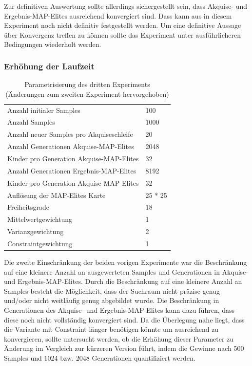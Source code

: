
Zur definitiven Auswertung sollte allerdings sichergestellt sein, dass Akquise- und Ergebnis-MAP-Elites ausreichend konvergiert sind.
Dass kann aus in diesem Experiment noch nicht definitiv festgestellt werden.
Um eine definitive Aussage über Konvergenz treffen zu können sollte das Experiment unter ausführlicheren Bedingungen wiederholt werden.

\subsubsection{Erhöhung der Laufzeit}
\label{sub:exp3rd}
\begin{table}[h]
	\centering
	\begin{tabularx}{.75\textwidth}{ll}\hline
		Anzahl initialer Samples & 100 \\
		Anzahl Samples & 1000 \\
		Anzahl neuer Samples pro Akquiseschleife & 20 \\
		Anzahl Generationen Akquise-MAP-Elites & 2048 \\
		Kinder pro Generation Akquise-MAP-Elites & 32 \\
		Anzahl Generationen Ergebnis-MAP-Elites & 8192 \\
		Kinder pro Generation Akquise-MAP-Elites & 32 \\
		Auflösung der MAP-Elites Karte & 25 * 25  \\
		\hline
		Freiheitsgrade & 18 \\
		Mittelwertgewichtung & 1 \\
		Varianzgewichtung & 2 \\
		Constraintgewichtung & 1 \\
	\end{tabularx}
	\label{tab:params3rd}
	\caption{Parametrisierung des dritten Experiments (Änderungen zum zweiten Experiment hervorgehoben)}
\end{table}

Die zweite Einschränkung der beiden vorigen Experimente war die Beschränkung auf eine kleinere Anzahl an ausgewerteten Samples und Generationen in Akquise- und Ergebnis-MAP-Elites.
Durch die Beschränkung auf eine kleinere Anzahl an Samples besteht die Möglichkeit, dass der Suchraum nicht präzise genug und/oder nicht weitläufig genug abgebildet wurde.
Die Beschränkung in Generationen des Akquise- und Ergebnis-MAP-Elites kann dazu führen, dass diese noch nicht vollständig konvergiert sind.
Da die Überlegung nahe liegt, dass die Variante mit Constraint länger benötigen könnte um ausreichend zu konvergieren, sollte untersucht werden, ob die Erhöhung dieser Parameter zu Änderung im Vergleich zur kürzeren Version führt, indem die Gewinne nach 500 Samples und 1024 bzw. 2048 Generationen quantifiziert werden.

